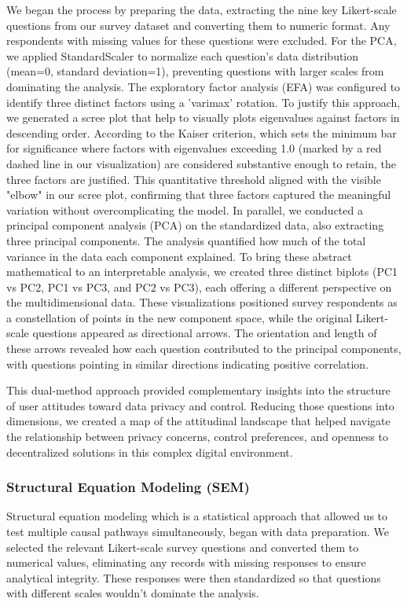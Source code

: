 	We began the process by preparing the data, extracting the nine key Likert-scale questions from our survey dataset and converting them to numeric format. Any respondents with missing values for these questions were excluded. For the PCA, we applied StandardScaler to normalize each question's data distribution (mean=0, standard deviation=1), preventing questions with larger scales from dominating the analysis. 
	The exploratory factor analysis (EFA) was configured to identify three distinct factors using a 'varimax' rotation. To justify this approach, we generated a scree plot that help to visually plots eigenvalues against factors in descending order. According to the Kaiser criterion, which sets the minimum bar for significance where factors with eigenvalues exceeding 1.0 (marked by a red dashed line in our visualization) are considered substantive enough to retain, the three factors are justified. This quantitative threshold aligned with the visible "elbow" in our scree plot, confirming that three factors captured the meaningful variation without overcomplicating the model.	
	In parallel, we conducted a principal component analysis (PCA) on the standardized data, also extracting three principal components. The analysis quantified how much of the total variance in the data each component explained. To bring these abstract mathematical to an interpretable analysis, we created three distinct biplots (PC1 vs PC2, PC1 vs PC3, and PC2 vs PC3), each offering a different perspective on the multidimensional data. These visualizations positioned survey respondents as a constellation of points in the new component space, while the original Likert-scale questions appeared as directional arrows. The orientation and length of these arrows revealed how each question contributed to the principal components, with questions pointing in similar directions indicating positive correlation.

	This dual-method approach provided complementary insights into the structure of user attitudes toward data privacy and control. Reducing those questions into dimensions, we created a map of the attitudinal landscape that helped navigate the relationship between privacy concerns, control preferences, and openness to decentralized solutions in this complex digital environment.
	\subsubsection{Structural Equation Modeling (SEM)}
	Structural equation modeling which is a statistical approach that allowed us to test multiple causal pathways simultaneously, began with data preparation. We selected the relevant Likert-scale survey questions and converted them to numerical values, eliminating any records with missing responses to ensure analytical integrity. These responses were then standardized so that questions with different scales wouldn't dominate the analysis.
	
